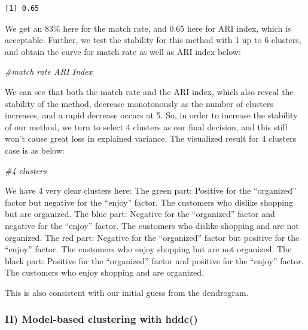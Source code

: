 \documentclass[
  11pt,
]{article}
\newenvironment{Shaded}{\begin{snugshade}}{\end{snugshade}}
\newcommand{\CommentTok}[1]{\textcolor[rgb]{0.56,0.35,0.01}{\textit{#1}}}
\begin{document}
\begin{verbatim}
[1] 0.65
\end{verbatim}

We get an 83\% here for the match rate, and 0.65 here for ARI index, which is acceptable. Further, we test the stability for this method with 1 up to 6 clusters, and obtain the curve for match rate as well as ARI index below:

\begin{Shaded}
\begin{Highlighting}[]
\CommentTok{\#match rate ARI Index}
\end{Highlighting}
\end{Shaded}

We can see that both the match rate and the ARI index, which also reveal the stability of the method, decrease monotonously as the number of clusters increases, and a rapid decrease occurs at 5. So, in order to increase the stability of our method, we turn to select 4 clusters as our final decision, and this still won't cause great loss in explained variance.
The visualized result for 4 clusters case is as below:

\begin{Shaded}
\begin{Highlighting}[]
\CommentTok{\#4 clusters}
\end{Highlighting}
\end{Shaded}

We have 4 very clear clusters here:
The green part: Positive for the ``organized'' factor but negative for the ``enjoy'' factor. The customers who dislike shopping but are organized.
The blue part: Negative for the ``organized'' factor and negative for the ``enjoy'' factor. The customers who dislike shopping and are not organized.
The red part: Negative for the ``organized'' factor but positive for the ``enjoy'' factor. The customers who enjoy shopping but are not organized.
The black part: Positive for the ``organized'' factor and positive for the ``enjoy'' factor. The customers who enjoy shopping and are organized.

This is also consistent with our initial guess from the dendrogram.

\hypertarget{ii-model-based-clustering-with-hddc}{%
\subsubsection{II) Model-based clustering with hddc()}\label{ii-model-based-clustering-with-hddc}}
\end{document}
